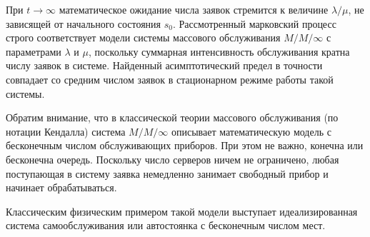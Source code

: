 \begin{eproof}
\begin{center}
\vspace{1.5em}

\begin{minipage}{0.48\textwidth}
    \centering
\end{minipage}
\hfill
\begin{minipage}{0.48\textwidth}
    \centering
    \end{minipage}
    \end{center}
\end{eproof}

\begin{note}[1]
    При $t \to \infty$ математическое ожидание числа заявок стремится к величине $\lambda/\mu$, не зависящей от начального состояния $s_0$. Рассмотренный марковский процесс строго соответствует модели системы массового обслуживания $M/M/\infty$ с параметрами $\lambda$ и $\mu$, поскольку суммарная интенсивность обслуживания кратна числу заявок в системе. Найденный асимптотический предел в точности совпадает со средним числом заявок в стационарном режиме работы такой системы.

    Обратим внимание, что в классической теории массового обслуживания (по нотации Кендалла) система $M/M/\infty$ описывает математическую модель с бесконечным числом обслуживающих приборов. При этом не важно, конечна или бесконечна очередь. Поскольку число серверов ничем не ограничено, любая поступающая в систему заявка немедленно занимает свободный прибор и начинает обрабатываться.

    Классическим физическим примером такой модели выступает идеализированная система самообслуживания или автостоянка с бесконечным числом мест.
    
\end{note}

